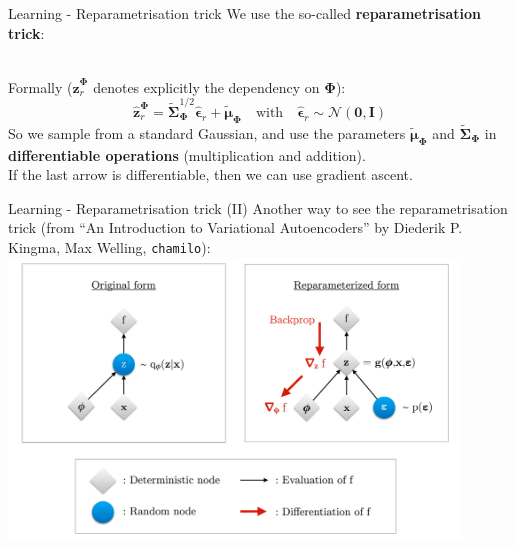 \documentclass{beamer}
\newcommand{\MN}{{\mathcal N}}
\newcommand{\bs}[1]{\boldsymbol{#1}}
\begin{document}
\begin{frame}{Learning - Reparametrisation trick}
 We use the so-called \textbf{reparametrisation trick}:\vspace{3mm}
    \vspace{3mm}\\
  Formally ($\hat{\bs{z}}_r^{\bs{\Phi}}$ denotes explicitly the dependency on $\bs{\Phi}$):
  \begin{equation}
   \hat{\bs{z}}_r^{\bs{\Phi}} = \tilde{\bs{\Sigma}}_{\bs{\Phi}}^{1/2}\hat{\bs{\epsilon}}_r + \tilde{\bs{\mu}}_{\bs{\Phi}} \quad\text{with}\quad \hat{\bs{\epsilon}}_r\sim \MN(\bs{0},\bs{I})
  \end{equation}
  So we sample from a standard Gaussian, and use the parameters $ \tilde{\bs{\mu}}_{\bs{\Phi}}$ and $\tilde{\bs{\Sigma}}_{\bs{\Phi}} $ in \textbf{differentiable operations} (multiplication and addition).\vspace{3mm}\\
  
  If the last arrow is differentiable, then we can use gradient ascent.
\end{frame}

\begin{frame}{Learning - Reparametrisation trick (II)}
 Another way to see the reparametrisation trick (from ``An Introduction to Variational Autoencoders'' by Diederik P. Kingma, Max Welling, \texttt{chamilo}):\\
 \centering
 \includegraphics[width=0.9\textwidth]{fig/reparametrisationtrick.png}
\end{frame}
\end{document}
